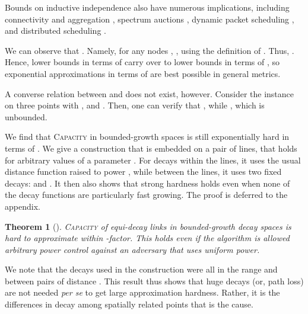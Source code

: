 \documentclass[11pt]{amsart}
\newcounter{foo}
\newtheorem{theorem}[foo]{Theorem}
\newtheorem{corollary}[lemma]{Corollary}
\newcommand{\prob}[1]{\textsc{#1}}
\newcommand{\Capacity}{\prob{Capacity}}
\newcommand{\capacity}{\Capacity}
\begin{document}
Bounds on inductive independence also have numerous implications,
including connectivity and aggregation \cite{SODA12,PODC12}, spectrum
auctions \cite{hoeferspaa,HoeferK12}, dynamic packet scheduling
\cite{sirocco12,kesselheimStability}, and distributed scheduling
\cite{KV10,icalp11}.

We can observe that . Namely, for any nodes ,
, 
using the definition of .
Thus, .
Hence, lower bounds in terms of 
carry over to lower bounds in terms of ,
so exponential approximations in terms of  are best
possible in general metrics.

A converse relation between  and  does not exist, however.
Consider the instance on three points  with 
,  and . 
Then, one can verify that , while 
, which is unbounded.


We find that {\capacity} in
bounded-growth spaces is still exponentially hard in terms of .
We give a construction that is embedded on a pair of lines,
that holds for arbitrary values of a parameter .
For decays within the lines, it uses the usual distance function raised to power ,
while between the lines, it uses two fixed decays:  and .
It then also shows that strong hardness holds even when none of the decay
functions are particularly fast growing. 
The proof is deferred to the appendix.

\begin{theorem}[\cite{GHWW09}]
\prob{Capacity} of equi-decay links in bounded-growth decay spaces
is hard to approximate within -factor.
This holds even if the algorithm is allowed 
arbitrary power control against an adversary that uses uniform power.
\label{thm:hardness}
\end{theorem}

We note that the decays used in the construction were all 
in the range  and  between pairs of distance .
This result thus shows that huge decays (or, path loss) are not
needed \emph{per se} to get large approximation hardness. Rather, it is the
differences in decay among spatially related points that is the
cause. 


\iffalse --- Not clear if this is of any value
Another corollary of the construction regards fixed-parameter tractability.

\begin{corollary}
\prob{Arbitrary Power Capacity} and \prob{Monotone Power Capacity}
are both W[1]-hard.
\label{thm:w1hardness}
\end{corollary}

(Proof to be added)
\fi
\end{document}
